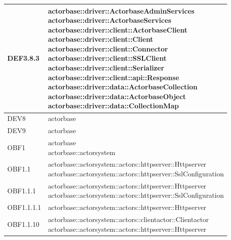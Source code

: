 \documentclass{scalatekids-article}
\begin{document}
\begin{longtable}[H]{|p{4.5cm}|p{13cm}|}
  \hline
  DEF3.8.3 & \multiLineCell[t]{actorbase::driver::ActorbaseAdminServices\\actorbase::driver::ActorbaseServices\\actorbase::driver::client::ActorbaseClient\\actorbase::driver::client::Client\\actorbase::driver::client::Connector\\actorbase::driver::client::SSLClient\\actorbase::driver::client::Serializer\\actorbase::driver::client::api::Response\\actorbase::driver::data::ActorbaseCollection\\actorbase::driver::data::ActorbaseObject\\actorbase::driver::data::CollectionMap\\}\\
  \hline
  DEV8 & \multiLineCell[t]{actorbase\\}\\
  \hline
  DEV9 & \multiLineCell[t]{actorbase\\}\\
  \hline
  OBF1 & \multiLineCell[t]{actorbase\\actorbase::actorsystem\\}\\
  \hline
  OBF1.1 & \multiLineCell[t]{actorbase::actorsystem::actors::httpserver::Httpserver\\actorbase::actorsystem::actors::httpserver::SslConfiguration\\}\\
  \hline
  OBF1.1.1 & \multiLineCell[t]{actorbase::actorsystem::actors::httpserver::Httpserver\\actorbase::actorsystem::actors::httpserver::SslConfiguration\\}\\
  \hline
  OBF1.1.1.1 & \multiLineCell[t]{actorbase::actorsystem::actors::httpserver::Httpserver\\}\\
  \hline
  OBF1.1.10 & \multiLineCell[t]{actorbase::actorsystem::actors::clientactor::Clientactor\\actorbase::actorsystem::actors::httpserver::Httpserver\\}\\

\end{longtable}
\end{document}
